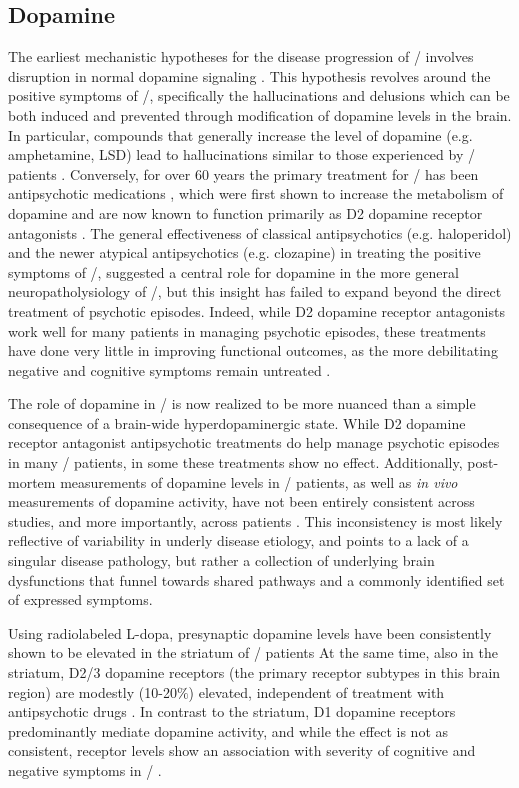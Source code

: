 \subsection{Dopamine}
The earliest mechanistic hypotheses for the disease progression of \scz/ involves disruption in normal dopamine signaling \citep{Matthysse1973}.
This hypothesis revolves around the positive symptoms of \scz/, specifically the hallucinations and delusions which can be both induced and prevented through modification of dopamine levels in the brain.
In particular, compounds that generally increase the level of dopamine (e.g. amphetamine, LSD) lead to hallucinations similar to those experienced by \scz/ patients \citep{Angrist1994, Lieberman1987}.
Conversely, for over 60 years the primary treatment for \scz/ has been antipsychotic medications \citep{Delay1952}, which were first shown to increase the metabolism of dopamine \citep{Carlsson1963} and are now known to function primarily as D2 dopamine receptor antagonists \citep{}.
The general effectiveness of classical antipsychotics (e.g. haloperidol) and the newer atypical antipsychotics (e.g. clozapine) in treating the positive symptoms of \scz/, suggested a central role for dopamine in the more general neuropatholysiology of \scz/, but this insight has failed to expand beyond the direct treatment of psychotic episodes.
Indeed, while D2 dopamine receptor antagonists work well for many patients in managing psychotic episodes, these treatments have done very little in improving functional outcomes, as the more debilitating negative and cognitive symptoms remain untreated \citep{Insel2010}.

The role of dopamine in \scz/ is now realized to be more nuanced than a simple consequence of a brain-wide hyperdopaminergic state.
While D2 dopamine receptor antagonist antipsychotic treatments do help manage psychotic episodes in many \scz/ patients, in some these treatments show no effect.
Additionally, post-mortem measurements of dopamine levels in \scz/ patients, as well as \emph{in vivo} measurements of dopamine activity, have not been entirely consistent across studies, and more importantly, across patients \citep{}.
This inconsistency is most likely reflective of variability in underly disease etiology, and points to a lack of a singular disease pathology, but rather a collection of underlying brain dysfunctions that funnel towards shared pathways and a commonly identified set of expressed symptoms.

Using radiolabeled L-dopa, presynaptic dopamine levels have been consistently shown to be elevated in the striatum of \scz/ patients \citep[for review, see][]{Howes2007}
At the same time, also in the striatum, D2/3 dopamine receptors (the primary receptor subtypes in this brain region) are modestly (10-20$\%$) elevated, independent of treatment with antipsychotic drugs \citep[for review, see][]{Howes2009}.
In contrast to the striatum, D1 dopamine receptors predominantly mediate dopamine activity, and while the effect is not as consistent, receptor levels show an association with severity of cognitive and negative symptoms in \scz/ \citep{Goldman-Rakic2004}.


